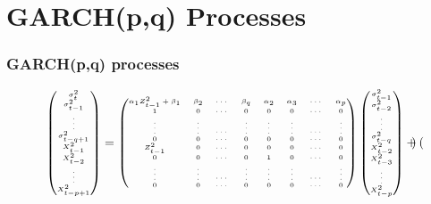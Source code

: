 \documentclass{beamer}
\begin{document}
\section{GARCH(p,q) Processes}
\begin{frame}
  \frametitle{GARCH(p,q) processes}
  \begin{equation*}
    \begin{tiny}
      \begin{pmatrix}
        \sigma_{t}^2 \\
        \sigma_{t-1}^2 \\
        \vdots \\
        \sigma_{t-q+1}^2 \\
        X_{t-1}^2 \\
        X_{t-2}^2 \\
        \vdots \\
        X_{t-p+1}^2
      \end{pmatrix} =
      \begin{pmatrix}
        \alpha_1 Z_{t-1}^2 + \beta_1 & \beta_2 & \cdots & \beta_q & \alpha_2 & \alpha_3 & \cdots & \alpha_p \\
        1 & 0 & \cdots & 0 & 0 & 0 & \cdots & 0 \\
        \vdots & \vdots & \cdots & \vdots & \vdots & \vdots & \cdots & \vdots \\
        0 & 0 & \cdots & 0 & 0 & 0 & \cdots & 0 \\
        Z_{t-1}^2 & 0 & \cdots & 0 & 0 & 0 & \cdots & 0 \\
        0 & 0 & \cdots & 0 & 1 & 0 & \cdots & 0 \\
        \vdots & \vdots & \cdots & \vdots & \vdots & \vdots & \cdots & \vdots \\
        0 & 0 & \cdots & 0 & 0 & 0 & \cdots & 0 \\    
      \end{pmatrix}
      \begin{pmatrix}
        \sigma_{t-1}^2 \\
        \sigma_{t-2}^2 \\
        \vdots \\
        \sigma_{t-q}^2 \\
        X_{t-2}^2 \\
        X_{t-3}^2 \\
        \vdots \\
        X_{t-p}^2
      \end{pmatrix} +
      \begin{pmatrix}

\end{pmatrix}
\end{tiny}
\end{equation*}
\end{frame}
\end{document}
